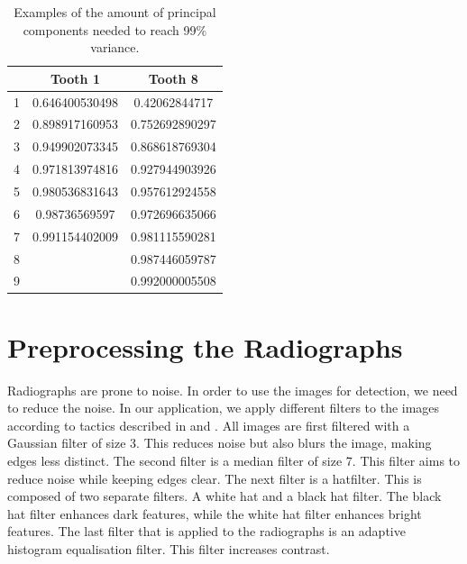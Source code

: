 \documentclass[11pt]{article}
\newcommand\Tstrut{\rule{0pt}{2.6ex}}       %
\newcommand\Bstrut{\rule[-0.9ex]{0pt}{0pt}} %
\newcommand{\TBstrut}{\Tstrut\Bstrut} %
\begin{document}
\begin{table}[H]
\centering
\begin{tabular}{c|c|c}
						& \textbf{Tooth 1} & \textbf{Tooth 8}  \TBstrut      \\ \hline
\multicolumn{1}{l|}{1} & 0.646400530498 & 0.42062844717 \TBstrut \\ \hline
\multicolumn{1}{l|}{2} & 0.898917160953 & 0.752692890297 \TBstrut\\ \hline
\multicolumn{1}{l|}{3} & 0.949902073345 & 0.868618769304 \TBstrut\\ \hline
\multicolumn{1}{l|}{4} & 0.971813974816 & 0.927944903926 \TBstrut\\ \hline
\multicolumn{1}{l|}{5} & 0.980536831643 & 0.957612924558 \TBstrut\\ \hline
\multicolumn{1}{l|}{6} & 0.98736569597  & 0.972696635066 \TBstrut\\ \hline
\multicolumn{1}{l|}{7} & 0.991154402009 & 0.981115590281 \TBstrut\\ \hline
\multicolumn{1}{l|}{8} &                & 0.987446059787 \TBstrut\\ \cline{1-1} \cline{3-3}
\multicolumn{1}{l|}{9} &                & 0.992000005508 \TBstrut\\ 
\end{tabular}
\caption{Examples of the amount of principal components needed to reach 99\% variance.}
\label{tbl:variance}
\end{table}

\section{Preprocessing the Radiographs}

Radiographs are prone to noise. In order to use the images for detection, we need to reduce the noise. In our application, we apply different filters to the images according to tactics described in \cite{imageenhance} and \cite{imageenhance2}. All images are first filtered with a Gaussian filter of size 3. This reduces noise but also blurs the image, making edges less distinct. The second filter is a median filter of size 7. This filter aims to reduce noise while keeping edges clear. The next filter is a hatfilter. This is composed of two separate filters. A white hat and a black hat filter. The black hat filter enhances dark features, while the white hat filter enhances bright features. The last filter that is applied to the radiographs is an adaptive histogram equalisation filter. This filter increases contrast.
\end{document}
